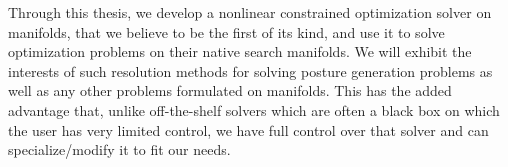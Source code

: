 Through this thesis, we develop a nonlinear constrained optimization solver on manifolds, that we believe to be the first of its kind, and use it to solve optimization problems on their native search manifolds.
We will exhibit the interests of such resolution methods for solving posture generation problems as well as any other problems formulated on manifolds.
This has the added advantage that, unlike off-the-shelf solvers which are often a black box on which the user has very limited control, we have full control over that solver and can specialize/modify it to fit our needs.






